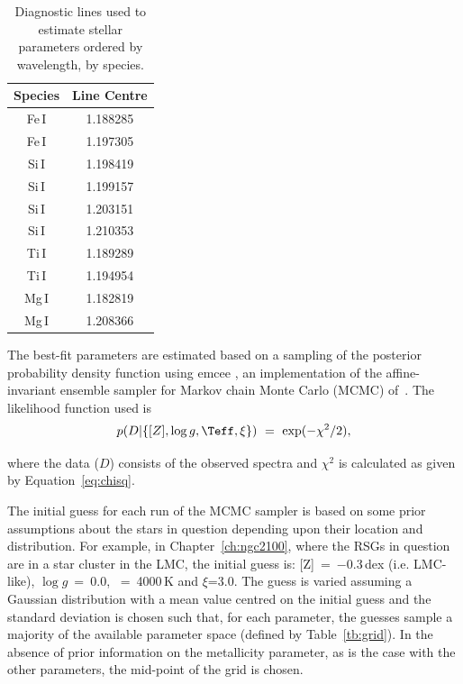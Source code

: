 \begin{table}
\caption[A list of the diagnostic lines used to estimate stellar parameters]{Diagnostic lines used to estimate stellar parameters ordered by wavelength, by species.\label{tb:lines}}
\scriptsize
\begin{center}
\begin{tabular}{cc}
 \hline
 \hline
Species & Line Centre \\
 \hline
Fe\,I & 1.188285 \\
Fe\,I & 1.197305 \\
Si\,I & 1.198419 \\
Si\,I & 1.199157 \\
Si\,I & 1.203151 \\
Si\,I & 1.210353 \\
Ti\,I & 1.189289 \\
Ti\,I & 1.194954 \\
Mg\,I & 1.182819\\
Mg\,I & 1.208366\\
 \hline
\end{tabular}
\end{center}
\end{table}

The best-fit parameters are estimated based on a sampling of the posterior probability density function using {\sc emcee}
\cite{2013PASP..125..306F},
an implementation of the affine-invariant ensemble sampler for Markov chain Monte Carlo (MCMC) of~\cite{2010CAMCS.5..65G}.
The likelihood function used is
\begin{equation}
    p(D|\{[Z], \log g, \Teff, \xi\})~=~\exp(-\chi^{2}/2), \label{eq:like}
\end{equation}

\noindent where the data ($D$) consists of the observed spectra and $\chi^{2}$ is calculated as given by Equation~\ref{eq:chisq}.

The initial guess for each run of the MCMC sampler is based on some prior assumptions about the stars in question depending upon their location and distribution.
For example, in Chapter~\ref{ch:ngc2100}, where the RSGs in question are in a star cluster in the LMC, the initial guess is: [Z]~=~$-$0.3\,dex (i.e. LMC-like), $\log g$~=~0.0, \Teff~=~4000\,K and $\xi$=3.0.
The guess is varied assuming a Gaussian distribution with a mean value centred on the initial guess and the standard deviation is chosen such that, for each parameter, the guesses sample a majority of the available parameter space (defined by Table~\ref{tb:grid}).
In the absence of prior information on the metallicity parameter, as is the case with the other parameters, the mid-point of the grid is chosen.

